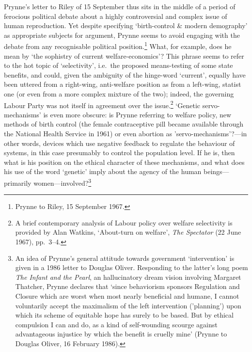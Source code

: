 \documentclass[]{article}
\begin{document}
Prynne's letter to Riley of 15 September thus sits in the middle of a
period of ferocious political debate about a highly controversial and
complex issue of human reproduction. Yet despite specifying
`birth-control \& modern demography' as appropriate subjects for
argument, Prynne seems to avoid engaging with the debate from any
recognisable political position.\footnote{Prynne to Riley, 15 September
  1967.} What, for example, does he mean by `the sophistry of current
welfare-economics'? This phrase seems to refer to the hot topic of
`selectivity', i.e.~the proposed means-testing of some state benefits,
and could, given the ambiguity of the hinge-word `current', equally have
been uttered from a right-wing, anti-welfare position as from a
left-wing, statist one (or even from a more complex mixture of the two);
indeed, the governing Labour Party was not itself in agreement over the
issue.\footnote{A brief contemporary analysis of Labour policy over
  welfare selectivity is provided by Alan Watkins, `About-turn on
  welfare', \emph{The Spectator} (22 June 1967), pp.~3--4.} `Genetic
servo-mechanisms' is even more obscure: is Prynne referring to welfare
policy, new methods of birth control (the female contraceptive pill
became available through the National Health Service in 1961) or even
abortion as 'servo-mechanisms'?---in other words, devices which use
negative feedback to regulate the behaviour of systems, in this case
presumably to control the population level. If he is, then what is his
position on the ethical character of these mechanisms, and what does his
use of the word `genetic' imply about the agency of the human
beings---primarily women---involved?\footnote{An idea of Prynne's
  general attitude towards government `intervention' is given in a 1986
  letter to Douglas Oliver. Responding to the latter's long poem
  \emph{The Infant and the Pearl}, an hallucinatory dream vision
  involving Margaret Thatcher, Prynne declares that `since behaviorism
  sponsors Regulation and Closure which are worst when most nearly
  beneficial and humane, I cannot voluntarily accept the maximalism of
  the left intervention ('planning') upon which its scheme of equitable
  hope has surely to be based. But by ethical compulsion I can and do,
  as a kind of self-wounding scourge against advantageous injustice by
  which the benefit is cruelly mine' (Prynne to Douglas Oliver, 16
  February 1986).}
\end{document}
